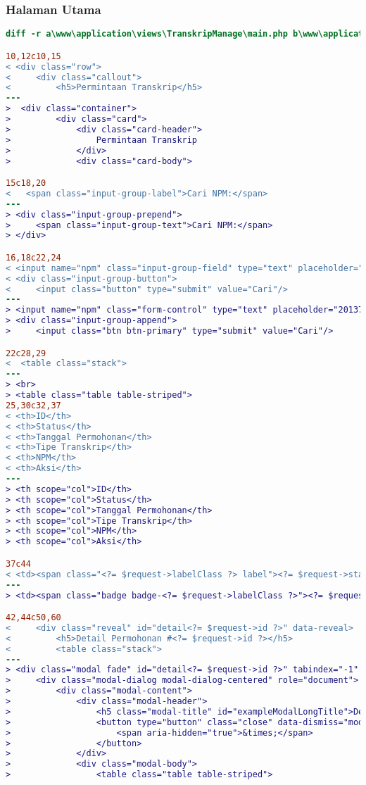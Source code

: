 \subsubsection{Halaman Utama}
\begin{lstlisting}[language=diff, caption=Perubahan file \path{\views\TranskripManage\main.php},  basicstyle=\ttfamily, frame=single,
columns=fullflexible, keepspaces=true, breaklines=true, label={lst:mainTranskripManage}]
diff -r a\www\application\views\TranskripManage\main.php b\www\application\views\TranskripManage\main.php

10,12c10,15 
< <div class="row">
<     <div class="callout">
<         <h5>Permintaan Transkrip</h5>
---
>  <div class="container">
>         <div class="card">
>             <div class="card-header">
>                 Permintaan Transkrip
>             </div>
>             <div class="card-body">

15c18,20
< 	<span class="input-group-label">Cari NPM:</span>
---
> <div class="input-group-prepend">
>     <span class="input-group-text">Cari NPM:</span>
> </div>

16,18c22,24
< <input name="npm" class="input-group-field" type="text" placeholder="2013730013" maxlength="10" minlength="10"<?= $npmQuery === NULL ? '' : " value='$npmQuery'" ?>/>
< <div class="input-group-button">
<     <input class="button" type="submit" value="Cari"/>
---
> <input name="npm" class="form-control" type="text" placeholder="2013730013" maxlength="10" minlength="10"<?= $npmQuery === NULL ? '' : " value='$npmQuery'" ?>/>
> <div class="input-group-append">
>     <input class="btn btn-primary" type="submit" value="Cari"/>

22c28,29
<  <table class="stack">
---
> <br>
> <table class="table table-striped">
25,30c32,37
< <th>ID</th>
< <th>Status</th>
< <th>Tanggal Permohonan</th>
< <th>Tipe Transkrip</th>
< <th>NPM</th>
< <th>Aksi</th>
---
> <th scope="col">ID</th>
> <th scope="col">Status</th>
> <th scope="col">Tanggal Permohonan</th>
> <th scope="col">Tipe Transkrip</th>
> <th scope="col">NPM</th>
> <th scope="col">Aksi</th>

37c44
< <td><span class="<?= $request->labelClass ?> label"><?= $request->status ?></span></td>
---
> <td><span class="badge badge-<?= $request->labelClass ?>"><?= $request->status ?></span></td>

42,44c50,60
<     <div class="reveal" id="detail<?= $request->id ?>" data-reveal>
<         <h5>Detail Permohonan #<?= $request->id ?></h5>
<         <table class="stack">
---
> <div class="modal fade" id="detail<?= $request->id ?>" tabindex="-1" role="dialog" aria-hidden="true">
>     <div class="modal-dialog modal-dialog-centered" role="document">
>         <div class="modal-content">
>             <div class="modal-header">
>                 <h5 class="modal-title" id="exampleModalLongTitle">Detail Permohonan #<?= $request->id ?></h5>
>                 <button type="button" class="close" data-dismiss="modal" aria-label="Close">
>                     <span aria-hidden="true">&times;</span>
>                 </button>
>             </div>
>             <div class="modal-body">
>                 <table class="table table-striped">


\end{lstlisting}

